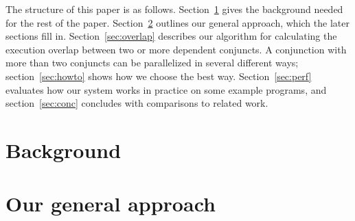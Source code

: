 The structure of this paper is as follows.
Section~\ref{sec:background} gives
the background needed for the rest of the paper.
Section~\ref{sec:approach} outlines our general approach,
which the later sections fill in.
Section~\ref{sec:overlap} describes our algorithm for calculating
the execution overlap between two or more dependent conjuncts.
A conjunction with more than two conjuncts can be parallelized
in several different ways;
section~\ref{sec:howto} shows how we choose the best way.
Section~\ref{sec:perf} evaluates
how our system works in practice on some example programs, and
section~\ref{sec:conc} concludes
with comparisons to related work.


\section{Background}
\label{sec:background}


\section{Our general approach}
\label{sec:approach}

% 


